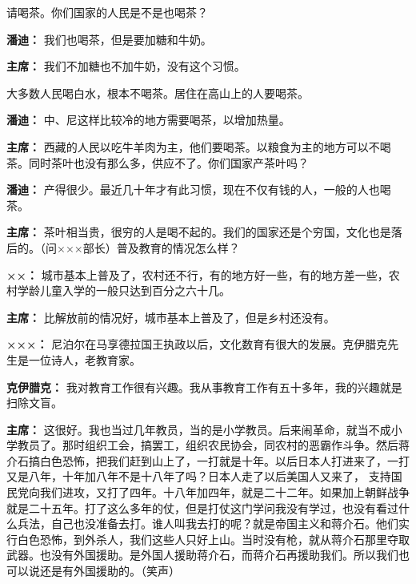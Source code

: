 \begin{duihua}
请喝茶。你们国家的人民是不是也喝茶？

\item[\textbf{潘迪：}] 我们也喝茶，但是要加糖和牛奶。

\item[\textbf{主席：}] 我们不加糖也不加牛奶，没有这个习惯。

大多数人民喝白水，根本不喝茶。居住在高山上的人要喝茶。

\item[\textbf{潘迪：}] 中、尼这样比较冷的地方需要喝茶，以增加热量。

\item[\textbf{主席：}] 西藏的人民以吃牛羊肉为主，他们要喝茶。以粮食为主的地方可以不喝茶。同时茶叶也没有那么多，供应不了。你们国家产茶叶吗？

\item[\textbf{潘迪：}] 产得很少。最近几十年才有此习惯，现在不仅有钱的人，一般的人也喝茶。

\item[\textbf{主席：}] 茶叶相当贵，很穷的人是喝不起的。我们的国家还是个穷国，文化也是落后的。（问×××部长）普及教育的情况怎么样？

\item[\textbf{××：}] 城市基本上普及了，农村还不行，有的地方好一些，有的地方差一些，农村学龄儿童入学的一般只达到百分之六十几。

\item[\textbf{主席：}] 比解放前的情况好，城市基本上普及了，但是乡村还没有。

\item[\textbf{×××：}] 尼泊尔在马享德拉国王执政以后，文化数育有很大的发展。克伊腊克先生是一位诗人，老教育家。

\item[\textbf{克伊腊克：}] 我对教育工作很有兴趣。我从事教育工作有五十多年，我的兴趣就是扫除文盲。

\item[\textbf{主席：}] 这很好。我也当过几年教员，当的是小学教员。后来闹革命，就当不成小学教员了。那时组织工会，搞罢工，组织农民协会，同农村的恶霸作斗争。然后蒋介石搞白色恐怖，把我们赶到山上了，一打就是十年。以后日本人打进来了，一打又是八年，十年加八年不是十八年了吗？日本人走了以后美国人又来了， 支持国民党向我们进攻，又打了四年。十八年加四年，就是二十二年。如果加上朝鲜战争就是二十五年。打了这么多年的仗，但是打仗这门学问我没有学过，也没有看过什么兵法，自己也没准备去打。谁人叫我去打的呢？就是帝国主义和蒋介石。他们实行白色恐怖，到外杀人，我们这些人只好上山。当时没有枪，就从蒋介石那里夺取武器。也没有外国援助。是外国人援助蒋介石，而蒋介石再援助我们。所以我们也可以说还是有外国援助的。（笑声）


\end{duihua}
